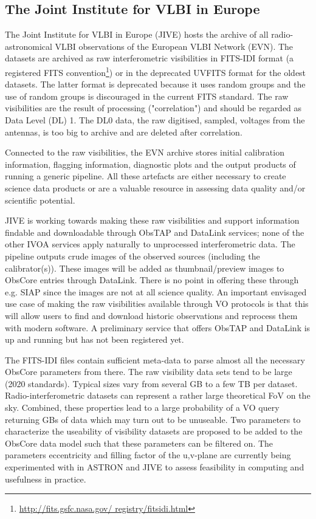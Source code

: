 \documentclass[11pt,a4paper]{ivoatex/ivoa}
\begin{document}
{\subsection{The Joint Institute for VLBI in Europe}
\label{sec:JIVE}
The Joint Institute for VLBI in Europe (JIVE) hosts the archive of all radio-astronomical VLBI 
observations of the European VLBI Network (EVN). The datasets are archived as raw interferometric 
visibilities in FITS-IDI format (a registered FITS convention\footnote{\url{ http://fits.gsfc.nasa.gov/
registry/fitsidi.html}}) or in the deprecated UVFITS format for the oldest datasets. The latter format 
is deprecated because it uses random groups and the use of random groups is discouraged in the current
FITS standard. The raw visibilities are the result of processing ("correlation") and should be regarded
as Data Level (DL) 1. The DL0 data, the raw digitised, sampled, voltages from the antennas, is too big to
archive and are deleted after correlation.

Connected to the raw visibilities, the EVN archive stores initial calibration information, flagging 
information, diagnostic plots and the output products of running a generic pipeline. All these artefacts 
are either necessary to create science data products or are a valuable resource in assessing data 
quality and/or scientific potential.

JIVE is working towards making these raw visibilities and support information findable and downloadable 
through ObsTAP and DataLink services; none of the other IVOA services apply naturally to unprocessed 
interferometric data. The pipeline outputs crude images of the observed sources (including the
calibrator(s)). These images will be added as thumbnail/preview images to ObsCore entries through 
DataLink. There is no point in offering these through e.g. SIAP since the images are not at all science 
quality. An important envisaged use case of making the raw visibilities available through VO protocols 
is that this will allow users to find and download historic observations and reprocess them with modern 
software.  A preliminary service that offers ObsTAP and DataLink is up and running but has not been
registered yet.

The FITS-IDI files contain sufficient meta-data to parse almost all the necessary ObsCore parameters 
from there. The raw visibility data sets tend to be large (2020 standards). Typical sizes vary from 
several GB to a few TB per dataset. Radio-interferometric datasets can represent a rather large 
theoretical FoV on the sky. Combined, these properties lead to a large probability of a VO query 
returning GBs of data which may turn out to be unuseable. Two parameters to characterize the useability 
of visibility datasets are proposed to be added to the ObsCore data model such that these parameters can 
be filtered on. The parameters eccentricity and filling factor of the u,v-plane are currently being 
experimented with in ASTRON and JIVE to assess feasibility in computing and usefulness in practice.

}
\end{document}
